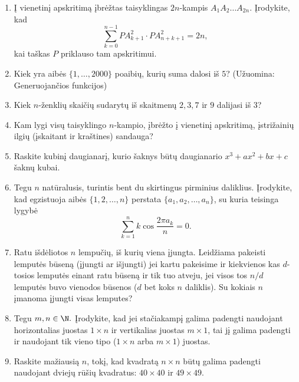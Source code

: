 \begin{enumerate}
\item Į vienetinį apskritimą įbrėžtas taisyklingas $2n$-kampis $A_1A_2\dots A_{2n}$. Įrodykite, kad 
$$\sum_{k=0}^{n-1}PA_{k+1}^2\cdot PA_{n+k+1}^2 = 2n,$$ kai taškas $P$ priklauso tam apskritimui.

\item Kiek yra aibės $\{1,\dots,2000\}$ poaibių, kurių suma dalosi iš $5$? (Užuomina: Generuojančios funkcijos)

\item Kiek $n$-ženklių skaičių sudarytų iš skaitmenų $2,3,7$ ir $9$ dalijasi iš $3$?

\item Kam lygi visų taisyklingo $n$-kampio, įbrėžto į vienetinį apskritimą, įstrižainių ilgių (įskaitant ir kraštines) sandauga?

\item Raskite kubinį daugianarį, kurio šaknys būtų daugianario $x^3 + ax^2 + bx + c$ šaknų kubai.

\item Tegu $n$ natūralusis, turintis bent du skirtingus pirminius daliklius. Įrodykite, kad egzistuoja aibės $\{1,2,\dots,n\}$ perstata $\{a_1,a_2,\dots,a_n\}$, su kuria teisinga lygybė 
$$\sum_{k=1}^nk\cos{\frac{2\pi a_k}{n}}=0.$$

\item Ratu išdėliotos $n$ lempučių, iš kurių viena įjungta. Leidžiama pakeisti lemputės būseną (įjungti ar išjungti) jei kartu pakeisime ir kiekvienos kas $d$-tosios lemputės einant ratu būseną ir tik tuo atveju, jei visos tos $n/d$ lemputės buvo vienodos būsenos ($d$ bet koks $n$ daliklis). Su kokiais $n$ įmanoma įjungti visas lemputes? 

\item Tegu $m, n \in \N.$ Įrodykite, kad jei stačiakampį galima padengti naudojant horizontalias juostas $1\times n$ ir vertikalias juostas $m\times 1$, tai jį galima padengti ir naudojant tik vieno tipo ($1\times n$ arba $m\times 1$) juostas.   

\item Raskite mažiausią $n$, tokį, kad kvadratą $n\times n$ būtų galima padengti naudojant dviejų rūšių kvadratus: $40\times 40$ ir $49\times 49$. 

\end{enumerate}



